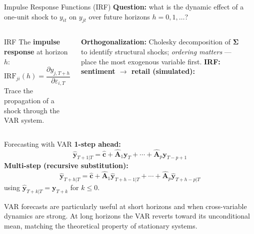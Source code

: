 \documentclass[aspectratio=169, 11pt]{beamer}
\begin{document}
\begin{frame}{Impulse Response Functions (IRF)}
  \textbf{Question:} what is the dynamic effect of a one-unit shock to
  $y_{it}$ on $y_{jt}$ over future horizons $h = 0,1,\ldots$?
  \begin{columns}[T]
      \begin{definitionbox}{IRF}
        {\small The \textbf{impulse response} at horizon $h$:
        \[
          \mathrm{IRF}_{ji}(h)
          = \frac{\partial y_{j,T+h}}{\partial \varepsilon_{i,T}}
        \]
        Trace the propagation of a shock through the VAR system.}
      \end{definitionbox}
      \textbf{Orthogonalization:} Cholesky decomposition of $\boldsymbol{\Sigma}$
      to identify structural shocks; \emph{ordering matters} ---
      place the most exogenous variable first.
      \textbf{IRF: sentiment $\to$ retail (simulated):}
      \\[-3pt]
  \end{columns}
\end{frame}

\begin{frame}{Forecasting with VAR}
  \textbf{1-step ahead:}
  \[
    \hat{\mathbf{y}}_{T+1|T}
    = \hat{\mathbf{c}} + \hat{\mathbf{A}}_1\mathbf{y}_T
      + \cdots + \hat{\mathbf{A}}_p\mathbf{y}_{T-p+1}
  \]
  \textbf{Multi-step (recursive substitution):}
  \[
    \hat{\mathbf{y}}_{T+h|T}
    = \hat{\mathbf{c}} + \hat{\mathbf{A}}_1\hat{\mathbf{y}}_{T+h-1|T}
      + \cdots + \hat{\mathbf{A}}_p\hat{\mathbf{y}}_{T+h-p|T}
  \]
  using $\hat{\mathbf{y}}_{T+k|T} = \mathbf{y}_{T+k}$ for $k \leq 0$.
  \begin{keybox}
    VAR forecasts are particularly useful at short horizons and when
    cross-variable dynamics are strong. At long horizons the VAR
    reverts toward its unconditional mean, matching the theoretical
    property of stationary systems.
  \end{keybox}
\end{frame}
\end{document}
